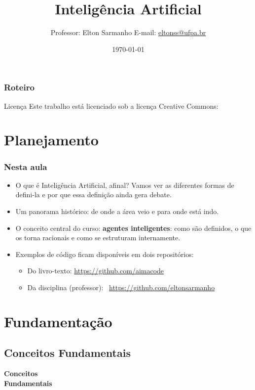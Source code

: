 \documentclass{beamer}
\title[]{Inteligência Artificial}
\author[Elton Sarmanho]{ 
Professor: Elton Sarmanho\inst{1} 
\newline
E-mail: \href{mailto:eltonss@ufpa.br}{eltonss@ufpa.br}\newline
\href{https://github.com/eltonsarmanho}{\faGithub} \href{https://www.linkedin.com/in/elton-sarmanho-836553185/}{\faLinkedin}\\
\ccbyncsa
}
\institute[UFRailwayPA]{
   \inst{1}%
     Faculdade de Sistemas de Informação - UFPA/CUNTINS
     }
\date{\today}
\begin{document}
\begin{frame}
\titlepage
\end{frame}

\begin{frame}
\frametitle{Roteiro}
\tableofcontents[sections={1-3}]
\end{frame}

\begin{frame}{Licença}
    Este trabalho está licenciado sob a licença Creative Commons:

    \bigskip
    \ccbyncsa
\end{frame}

\section{Planejamento}

\begin{frame}
\frametitle{Nesta aula}
\begin{itemize}
 \item O que é Inteligência Artificial, afinal? Vamos ver as diferentes formas de defini-la e por que essa definição ainda gera debate.
 \item Um panorama histórico: de onde a área veio e para onde está indo.
 \item O conceito central do curso: \textbf{agentes inteligentes}: como são definidos, o que os torna racionais e como se estruturam internamente.
 \item Exemplos de código ficam disponíveis em dois repositórios:
 \begin{itemize}
    \item Do livro-texto: \url{https://github.com/aimacode}
    \item Da disciplina (professor): \faGithub\ \url{https://github.com/eltonsarmanho}
 \end{itemize}
\end{itemize}
\end{frame}
\section{Fundamentação}
\subsection{Conceitos Fundamentais}
\begin{frame}
\centering
\Huge
\textbf{Conceitos\\ Fundamentais}
\end{frame}
\end{document}
